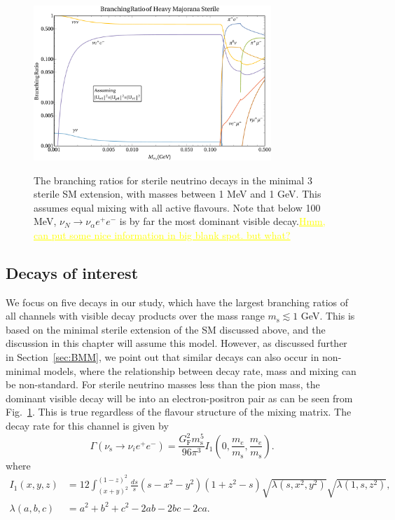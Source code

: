 \documentclass[11pt, a4paper]{article}
\newcommand{\reffig}[1]{Fig.~\ref{#1}}
\newcommand{\refsec}[1]{Section~\ref{#1}}
\newcommand{\newtext}[2]{\textcolor{#1}{\ul{#2}}}
\begin{document}
\begin{figure}[t]
%
	\centering
\includegraphics[width=0.8\textwidth]{figures/bounds1.pdf}\\
%
\caption{\label{fig:branchingratios}The branching ratios for sterile neutrino
decays in the minimal 3 sterile SM extension, with masses between 1 MeV and 1 GeV. This assumes equal
mixing with all active flavours. Note that below 100 MeV, $\nu_N \rightarrow \nu_\alpha e^+ e^-$ is by far the most dominant visible decay.\newtext{MARK}{Hmm, can put some nice information in big blank spot. but what?}}
%
\end{figure}

\subsection{Decays of interest}


We focus on five decays in our study, which have the largest branching ratios
of all channels with visible decay products over the mass range $m_\text{s}
\lesssim 1$ GeV. This is based on the minimal sterile extension of the SM
discussed above, and the discussion in this chapter will assume this model.
However, as discussed further in \refsec{sec:BMM}, we point out that similar
decays can also occur in non-minimal models, where the relationship between
decay rate, mass and mixing can be non-standard. 
%
For sterile neutrino masses less than the pion mass, the dominant visible decay
will be into an electron-positron pair as can be seen from
\reffig{fig:branchingratios}. This is true regardless of the flavour structure
of the mixing matrix. The decay rate for this channel is given by 
%
\[ \Gamma\left(\nu_\text{s}\to \nu_i e^+e^-\right) =
\frac{G_\text{F}^2m_\text{s}^5}{96\pi^3}I_1\left(0,\frac{m_e}{m_\text{s}},\frac{ m_e}{m_\text{s}}\right).  \]
%
where 
\begin{align}
	I_1(x,y,z) & =12 \int_{(x+y)^2}^{(1-z)^2} \frac{ds}{s}(s-x^2-y^2)(1+z^2-s)\sqrt{\lambda(s,x^2,y^2)}\sqrt{\lambda(1,s,z^2)},\\
\lambda(a,b,c) &= a^2+b^2+c^2 - 2ab-2bc-2ca.
\end{align}
\end{document}
